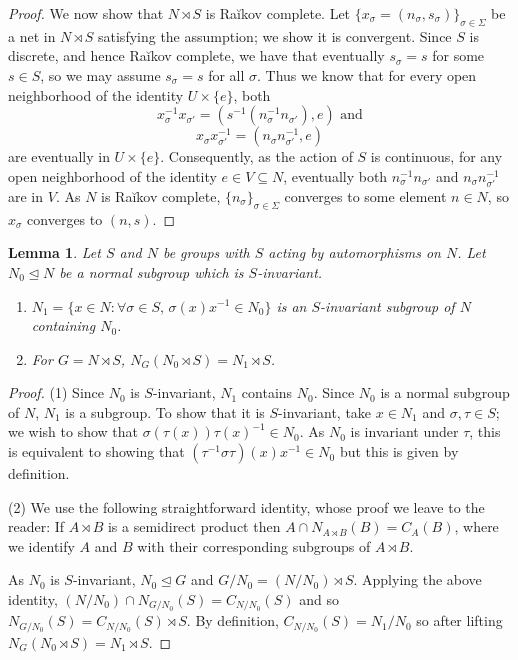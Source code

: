 \documentclass[11pt]{amsart}
\theoremstyle{plain}
\newtheorem{lemma}[theorem]{Lemma}
\theoremstyle{definition}
\newcounter{step}
\begin{document}
\begin{proof}
    We now show that $N\rtimes S$ is Ra\u{i}kov complete. Let $\{x_\sigma=(n_\sigma,s_\sigma)\}_{\sigma\in \Sigma}$ be a net in $N\rtimes S$ satisfying the assumption; we show it is convergent. Since $S$ is discrete, and hence Ra\u{i}kov complete, we have that eventually $s_\sigma=s$ for some $s\in S$, so we may assume $s_\sigma=s$ for all $\sigma$.  Thus we know that for every open neighborhood of the identity $U\times \{e\}$, both
 \[x_\sigma^{-1}x_{\sigma'}=(s^{-1}(n_\sigma^{-1}n_{\sigma'}),e) \text{ and}\]
    \[x_{\sigma}x_{\sigma'}^{-1}=(n_\sigma n_{\sigma'}^{-1},e)\] are eventually in $U\times\{e\}$. Consequently, as the action of $S$ is continuous, for any open neighborhood of the identity $e\in V\subseteq N$, eventually both  $n_\sigma^{-1}n_{\sigma'}$ and $n_\sigma n_{\sigma'}^{-1}$ are in $V$. As $N$ is  Ra\u{i}kov complete, $\{n_\sigma\}_{\sigma\in \Sigma}$ converges to some element $n\in N$, so $x_\sigma$ converges to $(n,s)$.
\end{proof}

\begin{lemma}\label{L: one step}
    Let $S$ and $N$ be groups with $S$ acting by automorphisms on $N$. Let $N_0\trianglelefteq N$ be a normal subgroup which is $S$-invariant.
    \begin{enumerate}
        \item $N_1=\{x\in N: \forall \sigma\in S,\, \sigma(x)x^{-1}\in N_0\}$ is an $S$-invariant subgroup of $N$ containing $N_0$.
        \item For $G=N\rtimes S$, $N_G(N_0\rtimes S)=N_1\rtimes S$.
    \end{enumerate}
\end{lemma}
\begin{proof}
    (1) Since $N_0$ is $S$-invariant, $N_1$ contains $N_0$. Since $N_0$ is a normal subgroup of $N$, $N_1$ is a subgroup. To show that it is $S$-invariant,  take $x\in N_1$ and $\sigma,\tau\in S$; we wish to show that $\sigma(\tau(x))\tau(x)^{-1}\in N_0$. As $N_0$ is invariant under $\tau$, this is equivalent to showing that $(\tau^{-1}\sigma\tau)(x)x^{-1}\in N_0$ but this is given by definition.

    (2) We use the following straightforward identity, whose proof we leave to the reader: If $A\rtimes B$ is a semidirect product then $A\cap N_{A\rtimes B}(B)=C_A(B)$, where we identify $A$ and $B$ with their corresponding subgroups of $A\rtimes B$.

    As $N_0$ is $S$-invariant, $N_0\trianglelefteq G$ and  $G/N_0=(N/N_0)\rtimes S$. Applying the above identity, $(N/N_0)\cap N_{G/N_0}(S)=C_{N/N_0}(S)$ and so $N_{G/N_0}(S)=C_{N/N_0}(S)\rtimes S$. By definition, $C_{N/N_0}(S)=N_1/N_0$ so after lifting $N_G(N_0\rtimes S)=N_1\rtimes S$.
\end{proof}
\end{document}
